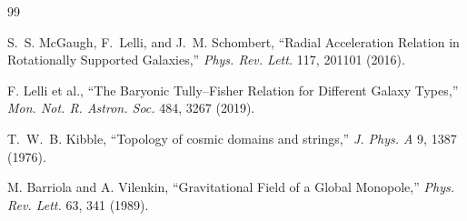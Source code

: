 \documentclass[11pt,a4paper]{article}
\begin{document}
\clearpage
\begin{thebibliography}{99}

S.~S. McGaugh, F.~Lelli, and J.~M. Schombert,
``Radial Acceleration Relation in Rotationally Supported Galaxies,''
{\em Phys. Rev. Lett.} 117, 201101 (2016).

F. Lelli et al.,
``The Baryonic Tully--Fisher Relation for Different Galaxy Types,''
{\em Mon. Not. R. Astron. Soc.} 484, 3267 (2019).

T.~W.~B. Kibble,
``Topology of cosmic domains and strings,''
{\em J. Phys. A} 9, 1387 (1976).

M. Barriola and A. Vilenkin,
``Gravitational Field of a Global Monopole,''
{\em Phys. Rev. Lett.} 63, 341 (1989).

\end{thebibliography}
\end{document}
